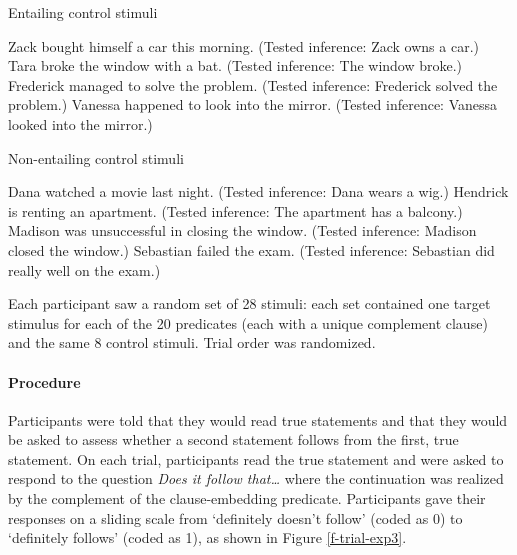 \documentclass[11pt,fleqn]{article}
\newcommand{\6}{\mbox{$[\hspace*{-.6mm}[$}}
\newcommand{\9}{\mbox{$]\hspace*{-.6mm}]$}}
\begin{document}
\begin{exe}
\ex\label{control-good2} Entailing control stimuli
\begin{xlist}
 Zack bought himself a car this morning. (Tested inference: Zack owns a car.)
 Tara broke the window with a bat. (Tested inference: The window broke.)
 Frederick managed to solve the problem. (Tested inference: Frederick solved the problem.)
 Vanessa happened to look into the mirror. (Tested inference: Vanessa looked into the mirror.)
\end{xlist}
\ex\label{control-bad2} Non-entailing control stimuli
\begin{xlist}
 Dana watched a movie last night. (Tested inference: Dana wears a wig.)
 Hendrick is renting an apartment. (Tested inference: The apartment has a balcony.)
 Madison was unsuccessful in closing the window. (Tested inference:  Madison closed the window.)
 Sebastian failed the exam. (Tested inference: Sebastian did really well on the exam.)
\end{xlist}
\end{exe}

Each participant saw a random set of 28 stimuli: each set contained one target stimulus for each of the 20 predicates (each with a unique complement clause) and the same 8 control stimuli. Trial order was randomized.

\paragraph{Procedure} Participants were told that they would read true statements and that they would be asked to assess whether a second statement follows from the first, true statement. On each trial, participants read the true statement and were asked to respond to the question {\em Does it follow that\ldots} where the continuation was realized by the complement of the clause-embedding predicate. Participants gave their responses on a sliding scale from `definitely doesn't follow' (coded as 0) to `definitely follows' (coded as 1), as shown in Figure \ref{f-trial-exp3}.
\end{document}
